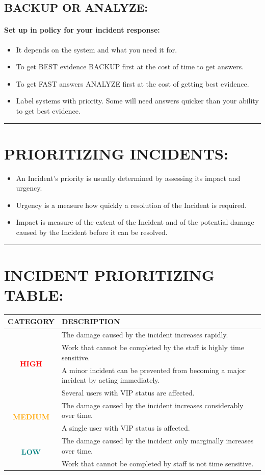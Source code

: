 \documentclass[10pt,british,english]{article}
\providecommand{\tabularnewline}{\\}
\begin{document}
\subsection{BACKUP OR ANALYZE:}

\paragraph{Set up in policy for your incident response:}
\begin{itemize}
\item It depends on the system and what you need it for.
\item To get BEST evidence BACKUP first at the cost of time to get answers.
\item To get FAST answers ANALYZE first at the cost of getting best evidence.
\item Label systems with priority. Some will need answers quicker than your
ability to get best evidence.
\end{itemize}
\rule[0.5ex]{1\columnwidth}{1pt}


\section{PRIORITIZING INCIDENTS:}
\begin{itemize}
\item An Incident's priority is usually determined by assessing its impact
and urgency.
\item Urgency is a measure how quickly a resolution of the Incident is required.
\item Impact is measure of the extent of the Incident and of the potential
damage caused by the Incident before it can be resolved.
\end{itemize}
\rule[0.5ex]{1\columnwidth}{1pt}

\pagebreak{}

\section{INCIDENT PRIORITIZING TABLE:}

\begin{tabular}{|c|l|}
\hline 
\textbf{CATEGORY} & \textbf{DESCRIPTION}\tabularnewline
\hline 
\hline 
\multirow{4}{*}{\textbf{\textcolor{red}{\Large{}HIGH}}} & The damage caused by the incident increases rapidly. \tabularnewline
\cline{2-2} 
 & Work that cannot be completed by the staff is highly time sensitive.\tabularnewline
\cline{2-2} 
 & A minor incident can be prevented from becoming a major incident by
acting immediately.\tabularnewline
\cline{2-2} 
 & Several users with VIP status are affected.\tabularnewline
\hline 
\multirow{2}{*}{\textbf{\textcolor{orange}{\Large{}MEDIUM}}} & The damage caused by the incident increases considerably over time. \tabularnewline
\cline{2-2} 
 & A single user with VIP status is affected. \tabularnewline
\hline 
\multirow{2}{*}{\textbf{\textcolor{teal}{\Large{}LOW}}} & The damage caused by the incident only marginally increases over time. \tabularnewline
\cline{2-2} 
 & Work that cannot be completed by staff is not time sensitive.\tabularnewline
\hline 
\end{tabular}
\end{document}
